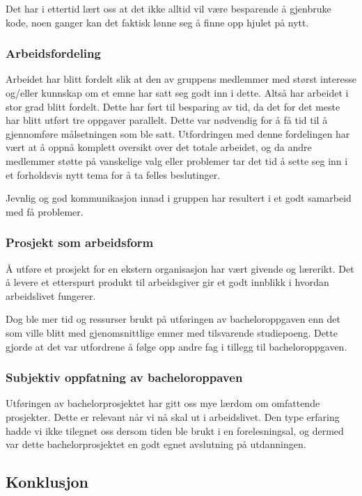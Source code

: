 Det har i ettertid lært oss at det ikke alltid vil være besparende å gjenbruke kode, noen ganger kan det faktisk lønne seg å finne opp hjulet på nytt.

\subsubsection{Arbeidsfordeling}

Arbeidet har blitt fordelt slik at den av gruppens medlemmer med størst interesse og/eller kunnskap om et emne har satt seg godt inn i dette. Altså har arbeidet i stor grad blitt fordelt. Dette har ført til besparing av tid, da det for det meste har blitt utført tre oppgaver parallelt. Dette var nødvendig for å få tid til å gjennomføre målsetningen som ble satt. Utfordringen med denne fordelingen har vært at å oppnå komplett oversikt over det totale arbeidet, og da andre medlemmer støtte på vanskelige valg eller problemer tar det tid å sette seg inn i et forholdsvis nytt tema for å ta felles beslutinger. 

Jevnlig og god kommunikasjon innad i gruppen har resultert i et godt samarbeid med få problemer. 

\subsubsection{Prosjekt som arbeidsform}

Å utføre et prosjekt for en ekstern organisasjon har vært givende og lærerikt. Det å levere et etterspurt produkt til arbeidsgiver gir et godt innblikk i hvordan arbeidslivet fungerer.

Dog ble mer tid og ressurser brukt på utføringen av bacheloroppgaven enn det som ville blitt med gjenomsnittlige emner med tilsvarende studiepoeng. Dette gjorde at det var utfordrene å følge opp andre fag i tillegg til bacheloroppgaven.

\subsubsection{Subjektiv oppfatning av bacheloroppaven}

Utføringen av bachelorprosjektet har gitt oss mye lærdom om omfattende prosjekter. Dette er relevant når vi nå skal ut i arbeidslivet. Den type erfaring hadde vi ikke tilegnet oss dersom tiden ble brukt i en forelesningsal, og dermed var dette bachelorprosjektet en godt egnet avslutning på utdanningen. 

\subsection{Konklusjon}

